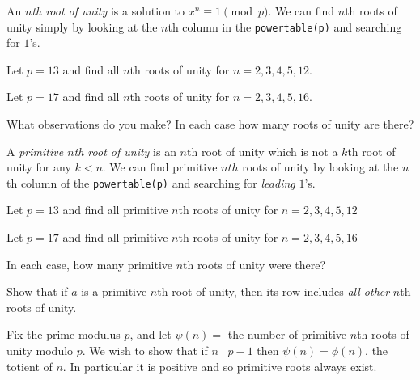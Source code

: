 \documentclass[12pt]{exam}
\begin{document}
\begin{questions}
  \question An \emph{$n$th root of unity} is a solution to $x^n\equiv1\pmod{p}$. We can find $n$th roots of unity simply by looking at the $n$th column in the \texttt{powertable(p)} and searching for $1$'s.
  \begin{parts}
    \item Let $p=13$ and find all $n$th roots of unity for $n=2,3,4,5,12$.
    \vspace{\fill}
    \item Let $p=17$ and find all $n$th roots of unity for $n=2,3,4,5,16$.
    \vspace{\fill}
    \item What observations do you make? In each case how many roots of unity are there?
    \vspace{\fill}
  \end{parts}
  \newpage
  \question A \emph{primitive $n$th root of unity} is an $n$th root of unity which is not a $k$th root of unity for any $k<n$. We can find primitive $nth$ roots of unity by looking at the $n$th column of the \texttt{powertable(p)} and searching for \emph{leading} $1$'s.
  \begin{parts}
    \item 
    \item Let $p=13$ and find all primitive $n$th roots of unity for $n=2,3,4,5,12$
    \item Let $p=17$ and find all primitive $n$th roots of unity for $n=2,3,4,5,16$
    \item In each case, how many primitive $n$th roots of unity were there?
    \item Show that if $a$ is a primitive $n$th root of unity, then its row includes \emph{all other} $n$th roots of unity.
  \end{parts}
  \newpage
  \question Fix the prime modulus $p$, and let $\psi(n)=$ the number of primitive $n$th roots of unity modulo $p$. We wish to show that if $n\mid p-1$ then $\psi(n)=\phi(n)$, the totient of $n$. In particular it is positive and so primitive roots always exist.
  

\end{questions}
\end{document}
